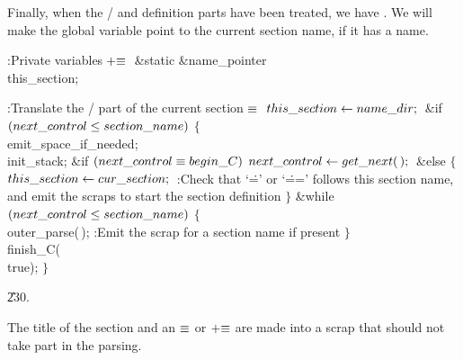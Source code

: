 Finally, when the \TEX/ and definition parts have been treated, we have
. We will make the global variable 
point to the current section name, if it has a name.

\Y\B\4:Private variables\X${}\mathrel+\equiv{}$\6
\&{static} \&{name\_pointer} \\{this\_section};\par
\fi

\B{}:Translate the \CEE/ part of the current section\X${}\equiv{}$\6
$\\{this\_section}\leftarrow\\{name\_dir};{}$\6
\&{if} ${}(\\{next\_control}\le\\{section\_name}){}$\5
${}\{{}$\1\6
\\{emit\_space\_if\_needed};\6
\\{init\_stack};\6
\&{if} ${}(\\{next\_control}\equiv\\{begin\_C}){}$\1\5
${}\\{next\_control}\leftarrow\\{get\_next}(\,);{}$\2\6
\&{else}\5
${}\{{}$\1\6
${}\\{this\_section}\leftarrow\\{cur\_section};{}$\6
:Check that `\.{=}' or `\.{==}' follows this section name, and emit the
scraps to start the section definition\X\6
\4${}\}{}$\2\6
\&{while} ${}(\\{next\_control}\le\\{section\_name}){}$\5
${}\{{}$\1\6
\\{outer\_parse}(\,);\6
:Emit the scrap for a section name if present\X\6
\4${}\}{}$\2\6
\\{finish\_C}(\\{true});\6
\4${}\}{}$\2\par
\U230.\fi

The title of the section and an $\equiv$ or $\mathrel+\equiv$ are made
into a scrap that should not take part in the parsing.

